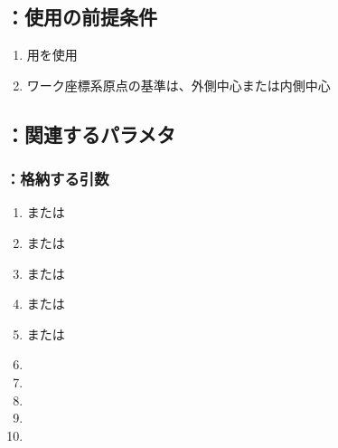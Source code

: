 \subsection{\KCurvedOutcutRLeft：使用の前提条件}
\begin{enumerate}[label*=\sarrow]
\item \OutcutMilling 用\SquareEndMill を使用
\item {}ワーク座標系原点の基準は、外側中心または内側中心
\end{enumerate}


\subsection{\KCurvedOutcutRLeft：関連するパラメタ}

\subsubsection{\KCurvedOutcutRLeft：格納する引数}
\begin{enumerate}[label*=\sarrow]
\item \PMTopOutcutACWidth または\PMBottomOutcutACWidth
\item \PMTopOutcutBDWidth または\PMBottomOutcutBDWidth
\item \PMTopOutcutCornerR または\PMBottomOutcutCornerR
\item \PMTopOutcutLength または\PMBottomOutcutLength
\item \PMTopReAlocationLength または\PMBottomReAlocationLength
\item \PMACOD
\item \PMBDOD
\item \PMCenterCurvatureRadius
\item \PMKeywayPos
\item \PMKeywayWidth
\end{enumerate}

